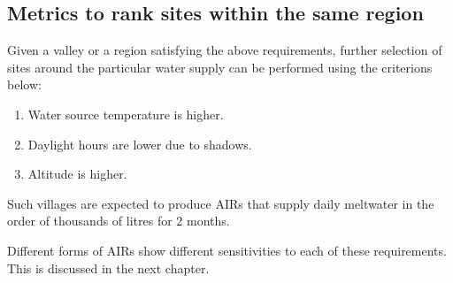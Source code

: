 \subsection{Metrics to rank sites within the same region }

Given a valley or a region satisfying the above requirements, further selection of sites around the particular
water supply can be performed using the criterions below: 

\begin{enumerate}
  \item Water source temperature is higher.
  \item Daylight hours are lower due to shadows.
  \item Altitude is higher.
\end{enumerate}

Such villages are expected to produce AIRs that supply daily meltwater in the order of thousands of litres for 2
months. 

Different forms of AIRs show different sensitivities to each of these requirements. This is discussed in the
next chapter.






